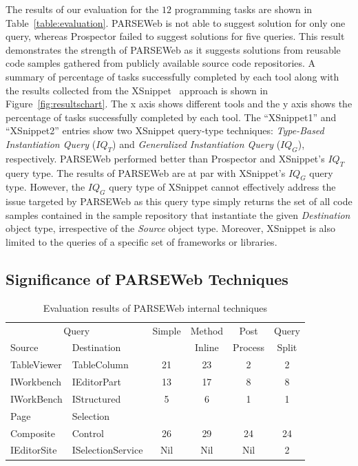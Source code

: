 \documentclass{fp035-thummalapenta}
\begin{document}
The results of our evaluation for the $12$ programming
tasks are shown in Table~\ref{table:evaluation}. PARSEWeb is not able to suggest
solution for only one query, whereas Prospector failed to suggest
solutions for five queries. This result demonstrates the strength of
PARSEWeb as it suggests solutions from reusable code samples
gathered from publicly available source code repositories. A summary
of percentage of tasks successfully completed by each tool along
with the results collected from the XSnippet~\cite{xsnippet:saha}
approach is shown in Figure~\ref{fig:resultschart}. The x axis
shows different tools and the y axis shows the percentage of tasks
successfully completed by each tool. The ``XSnippet1'' and
``XSnippet2'' entries show two XSnippet query-type techniques:
\emph{Type-Based Instantiation Query} ($IQ_{T}$) and
\emph{Generalized Instantiation Query} ($IQ_{G}$), respectively.
PARSEWeb performed better than Prospector and XSnippet's $IQ_{T}$
query type. The results of PARSEWeb are at par with XSnippet's
$IQ_{G}$ query type. However, the $IQ_{G}$ query type of XSnippet
cannot effectively address the issue targeted by PARSEWeb as
this query type simply returns the set of all code samples contained in the
sample repository that instantiate the given \emph{Destination}
object type, irrespective of the \emph{Source} object type. Moreover, XSnippet
is also limited to the queries of a specific set of frameworks or
libraries.
\subsection{Significance of PARSEWeb Techniques}
\label{sec:parsewebtech}
\setlength{\tabcolsep}{1pt}
\begin{table}[t]
\begin{SmallOut}
\begin{CodeOut}
\begin{center}
\centering \caption {\label{tab:internaltech} Evaluation results
 of PARSEWeb internal techniques}
\begin {tabular} {|l|l|c|c|c|c|}
\hline
\multicolumn{2}{|c|}{Query}&Simple&Method&Post&Query\\
\cline{1-2}
Source&Destination&&Inline&Process&Split\\
\hline
\hline TableViewer&TableColumn&21&23&2&2\\
\hline IWorkbench&IEditorPart&13&17&8&8\\
\hline IWorkBench&IStructured&5&6&1&1\\
             Page&Selection&&&&\\
\hline Composite&Control&26&29&24&24\\
\hline IEditorSite&ISelectionService&Nil&Nil&Nil&2\\
\hline
\end{tabular}
\end{center}
\end{CodeOut}
\end{SmallOut}
\vspace*{-4ex}
\end{table}
\end{document}

